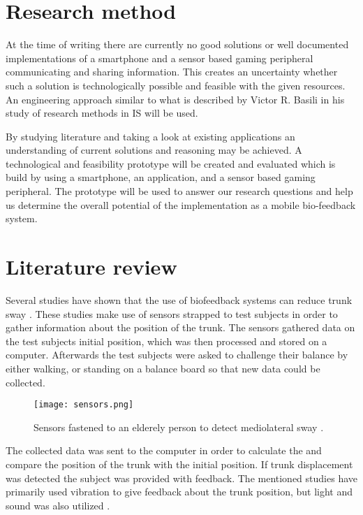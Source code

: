 \section{Research method}
At the time of writing there are currently no good solutions or well documented implementations of a smartphone and a sensor based gaming peripheral communicating and sharing information. This creates an uncertainty whether such a solution is technologically possible and feasible with the given resources. An engineering approach similar to what is described by Victor R. Basili\cite{paradigm} in his study of research methods in IS will be used.

By studying literature and taking a look at existing applications an understanding of current solutions and reasoning may be achieved. A technological and feasibility prototype will be created and evaluated which is build by using a smartphone, an application, and a sensor based gaming peripheral. The prototype will be used to answer our research questions and help us determine the overall potential of the implementation as a mobile bio-feedback system.

\section{Literature review}
Several studies have shown that the use of biofeedback systems can reduce trunk sway \cite{multiModualBiofeedback, vibrotactileBiofeedback, vibrotactileTiltFeedback}. These studies make use of sensors strapped to test subjects in order to gather information about the position of the trunk. The sensors gathered data on the test subjects initial position, which was then processed and stored on a computer. Afterwards the test subjects were asked to challenge their balance by either walking, or standing on a balance board so that new data could be collected.

\begin{figure}[h!]
  \centering
    \texttt{[image: sensors.png]}
    \caption{\footnotesize Sensors fastened to an elderely person to detect mediolateral sway \cite{vibrotactileTiltFeedback}.}
\end{figure}

The collected data was sent to the computer in order to calculate the and compare the position of the trunk with the initial position. If trunk displacement was detected the subject was provided with feedback. The mentioned studies have primarily used vibration to give feedback about the trunk position, but light and sound was also utilized \cite{multiModualBiofeedback}.

